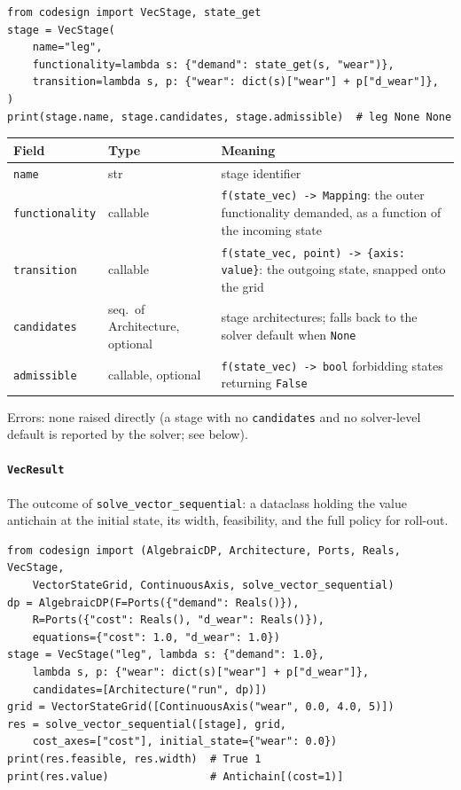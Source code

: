 \documentclass[11pt,a4paper]{article}
\begin{document}
\begin{lstlisting}
from codesign import VecStage, state_get
stage = VecStage(
    name="leg",
    functionality=lambda s: {"demand": state_get(s, "wear")},
    transition=lambda s, p: {"wear": dict(s)["wear"] + p["d_wear"]},
)
print(stage.name, stage.candidates, stage.admissible)  # leg None None
\end{lstlisting}

\begin{center}
\begin{tabular}{@{}llp{}@{}}
\toprule
Field & Type & Meaning \\
\midrule
\texttt{name} & str & stage identifier \\
\texttt{functionality} & callable & \texttt{f(state\_vec) -> Mapping}: the
  outer functionality demanded, as a function of the incoming state \\
\texttt{transition} & callable & \texttt{f(state\_vec, point) ->
  \{axis: value\}}: the outgoing state, snapped onto the grid \\
\texttt{candidates} & seq.\ of Architecture, optional & stage architectures;
  falls back to the solver default when \texttt{None} \\
\texttt{admissible} & callable, optional & \texttt{f(state\_vec) -> bool}
  forbidding states returning \texttt{False} \\
\bottomrule
\end{tabular}
\end{center}
Errors: none raised directly (a stage with no \texttt{candidates} and no
solver-level default is reported by the solver; see below).

\paragraph{\texttt{VecResult}}\label{ref:vector_dp:vecresult}
The outcome of \texttt{solve\_vector\_sequential}: a dataclass holding the
value antichain at the initial state, its width, feasibility, and the full
policy for roll-out.

\begin{lstlisting}
from codesign import (AlgebraicDP, Architecture, Ports, Reals, VecStage,
    VectorStateGrid, ContinuousAxis, solve_vector_sequential)
dp = AlgebraicDP(F=Ports({"demand": Reals()}),
    R=Ports({"cost": Reals(), "d_wear": Reals()}),
    equations={"cost": 1.0, "d_wear": 1.0})
stage = VecStage("leg", lambda s: {"demand": 1.0},
    lambda s, p: {"wear": dict(s)["wear"] + p["d_wear"]},
    candidates=[Architecture("run", dp)])
grid = VectorStateGrid([ContinuousAxis("wear", 0.0, 4.0, 5)])
res = solve_vector_sequential([stage], grid,
    cost_axes=["cost"], initial_state={"wear": 0.0})
print(res.feasible, res.width)  # True 1
print(res.value)                # Antichain[(cost=1)]
\end{lstlisting}
\end{document}

